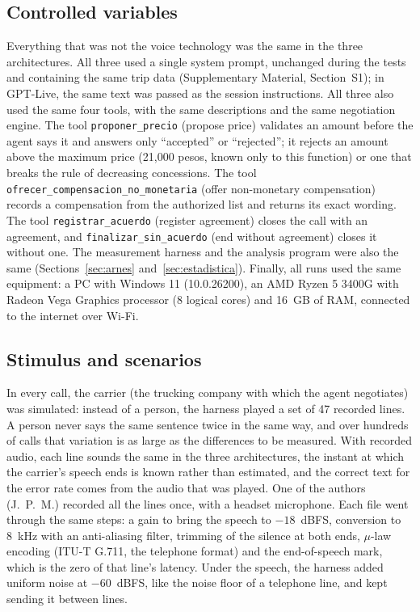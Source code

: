 \documentclass[11pt]{article}
\newcommand{\REntCpu}{AMD Ryzen 5 3400G with Radeon Vega Graphics}
\newcommand{\REntNucleos}{8}
\newcommand{\REntSistema}{Windows 11 (10.0.26200)}
\newcommand{\RGuionLineas}{47}
\begin{document}
\subsection{Controlled variables}\label{sec:igual}

Everything that was not the voice technology was the same in the three architectures.
All three used a single system prompt, unchanged during the tests and containing the same trip data (Supplementary Material, Section~S1); in GPT-Live, the same text was passed as the session instructions.
All three also used the same four tools, with the same descriptions and the same negotiation engine.
The tool \texttt{proponer\_precio} (propose price) validates an amount before the agent says it and answers only ``accepted'' or ``rejected''; it rejects an amount above the maximum price (21,000 pesos, known only to this function) or one that breaks the rule of decreasing concessions.
The tool \texttt{ofrecer\_compensacion\_no\_monetaria} (offer non-monetary compensation) records a compensation from the authorized list and returns its exact wording.
The tool \texttt{registrar\_acuerdo} (register agreement) closes the call with an agreement, and \texttt{finalizar\_sin\_acuerdo} (end without agreement) closes it without one.
The measurement harness and the analysis program were also the same (Sections~\ref{sec:arnes} and~\ref{sec:estadistica}).
Finally, all runs used the same equipment: a PC with \REntSistema, an \REntCpu{} processor (\REntNucleos{} logical cores) and 16~GB of RAM, connected to the internet over Wi-Fi.

\subsection{Stimulus and scenarios}\label{sec:estimulo}

In every call, the carrier (the trucking company with which the agent negotiates) was simulated: instead of a person, the harness played a set of \RGuionLineas{} recorded lines. A person never says the
same sentence twice in the same way, and over hundreds of calls that variation is as
large as the differences to be measured. With recorded audio, each line sounds the
same in the three architectures, the instant at which the carrier's speech ends is known
rather than estimated, and the correct text for the error rate comes from the audio
that was played. One of the authors (J.~P.~M.) recorded all the lines once, with a
headset microphone. Each file went through the same steps: a gain to bring the speech
to $-18$~dBFS, conversion to 8~kHz with an anti-aliasing filter, trimming of the
silence at both ends, $\mu$-law encoding (ITU-T G.711, the telephone format) and the
end-of-speech mark, which is the zero of that line's latency. Under the speech, the harness added uniform noise at $-60$~dBFS, like the noise floor of a telephone line, and kept sending it between lines.
\end{document}
